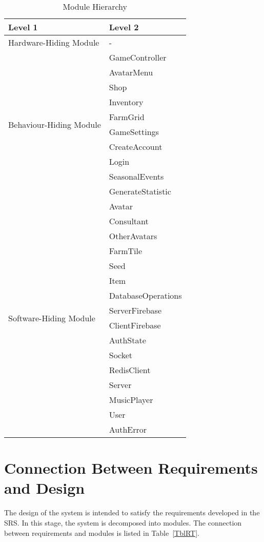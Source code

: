\documentclass[12pt, titlepage]{article}
\begin{document}
\begin{table}[H]
\centering
\begin{tabular}{p{} p{}}
\toprule
\textbf{Level 1} & \textbf{Level 2}\\
\midrule

{Hardware-Hiding Module} & - \\
\midrule

\multirow{10}{0.3\textwidth}{Behaviour-Hiding Module} & GameController\\
& AvatarMenu\\
& Shop\\
& Inventory\\
& FarmGrid\\
& GameSettings\\
& CreateAccount\\
& Login\\
& SeasonalEvents\\
& GenerateStatistic\\
\midrule

\multirow{18}{0.3\textwidth}{Software-Hiding Module} & Avatar\\
& Consultant\\
& OtherAvatars\\
& FarmTile\\
& Seed\\
& Item\\
& DatabaseOperations\\ 
& ServerFirebase\\
& ClientFirebase\\
& AuthState\\
& Socket\\
& RedisClient\\
& Server\\ 
& MusicPlayer \\
& User \\
& AuthError \\
\bottomrule

\end{tabular}
\caption{Module Hierarchy}
\label{TblMH}
\end{table}

\section{Connection Between Requirements and Design} \label{SecConnection}

The design of the system is intended to satisfy the requirements developed in
the SRS. In this stage, the system is decomposed into modules. The connection
between requirements and modules is listed in Table~\ref{TblRT}.
\end{document}
